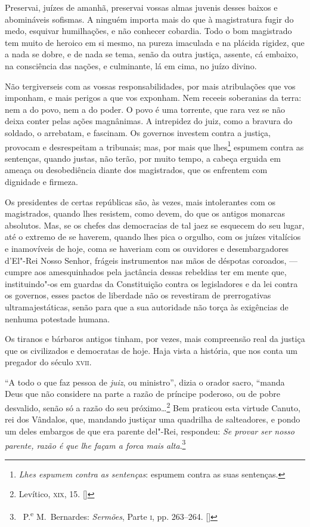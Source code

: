 Preservai, juízes de amanhã, preservai vossas almas juvenis desses
baixos e abomináveis sofismas. A ninguém importa mais do que à
magistratura fugir do medo, esquivar humilhações, e não conhecer
cobardia. Todo o bom magistrado tem muito de heroico em si mesmo, na
pureza imaculada e na plácida rigidez, que a nada se dobre, e de nada
se tema, senão da outra justiça, assente, cá embaixo, na consciência
das nações, e culminante, lá em cima, no juízo divino.

Não tergiverseis com as vossas responsabilidades, por mais
atribulações que vos imponham, e mais perigos a que vos exponham. Nem
receeis soberanias da terra: nem a do povo, nem a do poder. O povo é
uma torrente, que rara vez se não deixa conter pelas ações magnânimas.
A intrepidez do juiz, como a bravura do soldado, o arrebatam, e
fascinam. Os governos investem contra a justiça, provocam e
desrespeitam a tribunais; mas, por mais que lhes\footnote{ \textit{Lhes
espumem contra as sentenças}: espumem contra as suas sentenças.}
espumem contra as sentenças, quando justas, não terão, por muito tempo,
a cabeça erguida em ameaça ou desobediência diante dos magistrados, que
os enfrentem com dignidade e firmeza.

Os presidentes de certas repúblicas são, às vezes, mais
intolerantes com os magistrados, quando lhes resistem, como devem, do
que os antigos monarcas absolutos. Mas, se os chefes das democracias de
tal jaez se esquecem do seu lugar, até o extremo de se haverem, quando
lhes pica o orgulho, com os juízes vitalícios e inamovíveis de hoje,
coma se haveriam com os ouvidores e desembargadores
d'El"-Rei Nosso Senhor, frágeis instrumentos nas mãos
de déspotas coroados, --- cumpre aos amesquinhados pela jactância dessas
rebeldias ter em mente que, instituindo"-os em guardas da Constituição
contra os legisladores e da lei contra os governos, esses pactos de
liberdade não os revestiram de prerrogativas ultramajestáticas, senão
para que a sua autoridade não torça às exigências de nenhuma potestade
humana.

Os tiranos e bárbaros antigos tinham, por vezes, mais compreensão
real da justiça que os civilizados e democratas de hoje. Haja vista a
história, que nos conta um pregador do século \textsc{xvii}.

``A todo o que faz pessoa de \textit{juiz}, ou
ministro'', dizia o orador sacro, ``manda
Deus que não considere na parte a razão de príncipe poderoso, ou de
pobre desvalido, senão só a razão do seu próximo\ldots{}\footnote{ Levítico,
\textsc{xix}, 15. []} Bem praticou esta virtude Canuto, rei dos Vândalos, que, mandando
justiçar uma quadrilha de salteadores, e pondo um deles embargos de que
era parente del"-Rei, respondeu: \textit{Se provar ser nosso parente,
razão é que lhe façam a forca mais alta}.\footnote{\ P.\textsuperscript{e} 
M.~Bernardes: \textit{Sermões}, Parte \textsc{i}, pp. 263--264. []}

